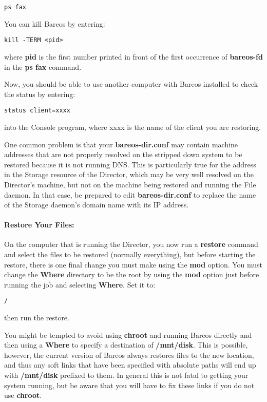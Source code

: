\footnotesize
\begin{verbatim}
ps fax
\end{verbatim}
\normalsize

You can kill Bareos by entering:

\footnotesize
\begin{verbatim}
kill -TERM <pid>
\end{verbatim}
\normalsize

where {\bf pid} is the first number printed in front of the first occurrence
of {\bf bareos-fd} in the {\bf ps fax} command.

Now, you should be able to use another computer with Bareos installed to check
the status by entering:

\footnotesize
\begin{verbatim}
status client=xxxx
\end{verbatim}
\normalsize

into the Console program, where xxxx is the name of the client you are
restoring.

One common problem is that your {\bf bareos-dir.conf} may contain machine
addresses that are not properly resolved on the stripped down system to be
restored because it is not running DNS. This is particularly true for the
address in the Storage resource of the Director, which may be very well
resolved on the Director's machine, but not on the machine being restored and
running the File daemon. In that case, be prepared to edit {\bf
bareos-dir.conf} to replace the name of the Storage daemon's domain name with
its IP address.

\paragraph*{Restore Your Files:}

On the computer that is running the Director, you now run a {\bf restore}
command and select the files to be restored (normally everything), but before
starting the restore, there is one final change you must make using the {\bf
mod} option. You must change the {\bf Where} directory to be the root by using
the {\bf mod} option just before running the job and selecting {\bf Where}.
Set it to:

\footnotesize
\begin{verbatim}
/
\end{verbatim}
\normalsize

then run the restore.

You might be tempted to avoid using {\bf chroot} and running Bareos directly
and then using a {\bf Where} to specify a destination of {\bf /mnt/disk}. This
is possible, however, the current version of Bareos always restores files to
the new location, and thus any soft links that have been specified with
absolute paths will end up with {\bf /mnt/disk} prefixed to them. In general
this is not fatal to getting your system running, but be aware that you will
have to fix these links if you do not use {\bf chroot}.

